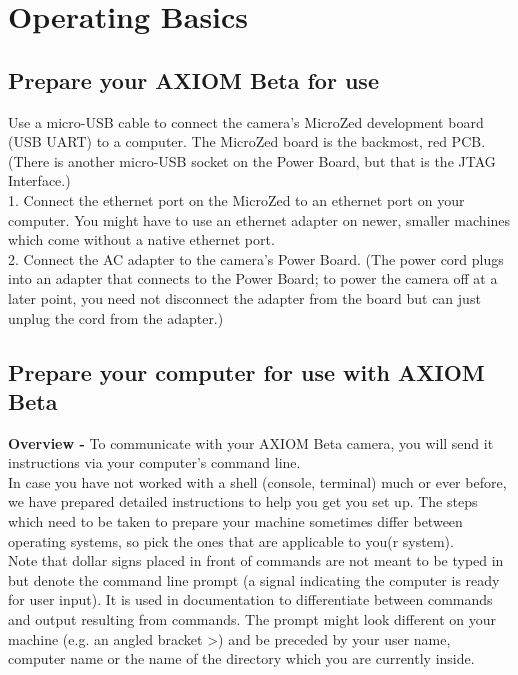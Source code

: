 \section{Operating Basics}

\subsection{Prepare your AXIOM Beta for use}

Use a micro-USB cable to connect the camera's MicroZed development board (USB UART) to a computer. The MicroZed board is the backmost, red PCB. (There is another micro-USB socket on the Power Board, but that is the JTAG Interface.)\\

1. Connect the ethernet port on the MicroZed to an ethernet port on your computer. You might have to use an ethernet adapter on newer, smaller machines which come without a native ethernet port.\\ 

2. Connect the AC adapter to the camera's Power Board. (The power cord plugs into an adapter that connects to the Power Board; to power the camera off at a later point, you need not disconnect the adapter from the board but can just unplug the cord from the adapter.)


\subsection{Prepare your computer for use with AXIOM Beta}

\textbf{Overview -} To communicate with your AXIOM Beta camera, you will send it instructions via your computer's command line.\\

In case you have not worked with a shell (console, terminal) much or ever before, we have prepared detailed instructions to help you get you set up. The steps which need to 	be taken to prepare your machine sometimes differ between operating systems, so pick the ones that are applicable to you(r system). \\

Note that dollar signs placed in front of commands are not meant to be typed in but denote 	the command line prompt (a signal indicating the computer is ready for user input). It is used in documentation to differentiate between commands and output resulting from commands. The prompt might look different on your machine (e.g. an angled bracket >) and be preceded by your user name, computer name or the name of the directory which you are currently inside.



